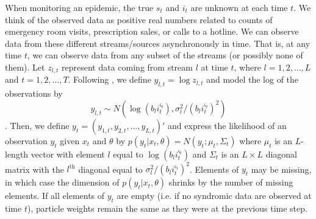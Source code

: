 \documentclass[useAMS,referee,usenatbib]{biom}
\begin{document}

When monitoring an epidemic, the true $s_t$ and $i_t$ are unknown at each time $t$. We think of the observed data as positive real numbers related to counts of emergency room visits, prescription sales, or calls to a hotline.  %
We can observe data from these different streams/sources asynchronously in time.  That is, at any time $t$, we can observe data from any subset of the streams (or possibly none of them).  Let $z_{l,t}$ represent data coming from stream $l$ at time $t$, where $l = 1,2,\ldots,L$ and $t = 1,2,\ldots,T$.  %
Following \citet{skvortsov2012monitoring}, we define $y_{l,t} = \log z_{l,t}$ and model the log of the observations by
\begin{equation}
y_{l,t} \sim N\left(\log\left(b_li_t^{\varsigma_l}\right),\sigma_l^2 / (b_li_t^{\varsigma_l})^2\right) \label{eqn:obs}
\end{equation}.
\noindent Then, we define $y_t = (y_{1,t},y_{2,t},\ldots,y_{L,t})'$ and express the likelihood of an observation $y_t$ given $x_t$ and $\theta$ by $p(y_t|x_t,\theta) = N(y_t;\mu_t,\Sigma_t)$ where $\mu_t$ is an $L$-length vector with element $l$ equal to $\log(b_li_t^{\varsigma_l})$ and $\Sigma_t$ is an $L \times L$ diagonal matrix with the $l^{\mbox{th}}$ diagonal equal to $\sigma_l^2 / (b_li_t^{\varsigma_l})^2$.  Elements of $y_t$ may be missing, in which case the dimension of $p(y_t|x_t,\theta)$ shrinks by the number of missing elements. %
If all elements of $y_t$ are empty (i.e. if no syndromic data are observed at time $t$), particle weights remain the same as they were at the previous time step.
\end{document}
